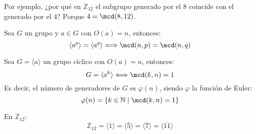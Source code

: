 \begin{ejemplo}
    Por ejemplo, ¿por qué en $\mathbb{Z}_{12}$ el subgrupo generado por el 8 coincide con el generado por el 4? Porque $4 = \mcd(8,12)$.
\end{ejemplo}

\begin{coro}
    Sea $G$ un grupo y $a\in G$ con $O(a) = n$, entonces:
    \begin{equation*}
        \langle a^p \rangle  = \langle a^q \rangle  \Longleftrightarrow \mcd(n,p) = \mcd(n,q)
    \end{equation*}
\end{coro}

\begin{coro}
    Sea $G = \langle a \rangle $ un grupo cíclico con $O(a) = n$, entonces:
    \begin{equation*}
        G = \langle a^k \rangle  \Longleftrightarrow \mcd(k,n) = 1
    \end{equation*}
    Es decir, el número de generadores de $G$ es $\varphi(n)$, siendo $\varphi$ la función de Euler:
    \begin{equation*}
        \varphi(n) = \{k\in \mathbb{N} \mid \mcd(k,n) = 1\}
    \end{equation*}
\end{coro}

\begin{ejemplo}
    En $\mathbb{Z}_{12}$:
    \begin{equation*}
        \mathbb{Z}_{12} = \langle \overline{1} \rangle  = \langle \overline{5} \rangle  = \langle \overline{7} \rangle  = \langle \overline{11} \rangle 
    \end{equation*}
\end{ejemplo}
